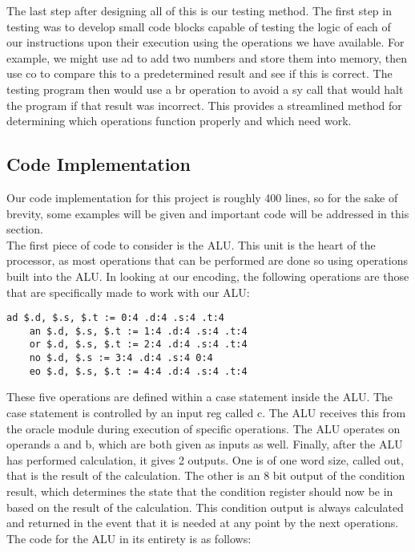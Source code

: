 \documentclass[journal]{IEEEtran}
\begin{document}
	The last step after designing all of this is our testing method. The first step in testing was to develop small code blocks capable of testing the logic of each of our instructions upon their execution using the operations we have available. For example, we might use ad to add two numbers and store them into memory, then use co to compare this to a predetermined result and see if this is correct. The testing program then would use a br operation to avoid a sy call that would halt the program if that result was incorrect. This provides a streamlined method for determining which operations function properly and which need work.

\subsection{Code Implementation}
	Our code implementation for this project is roughly 400 lines, so for the sake of brevity, some examples will be given and important code will be addressed in this section.\\
	
	The first piece of code to consider is the ALU. This unit is the heart of the processor, as most operations that can be performed are done so using operations built into the ALU. In looking at our encoding, the following operations are those that are specifically made to work with our ALU:
	
	\begin{Verbatim}[fontsize=\small]
	ad $.d, $.s, $.t := 0:4 .d:4 .s:4 .t:4
	an $.d, $.s, $.t := 1:4 .d:4 .s:4 .t:4
	or $.d, $.s, $.t := 2:4 .d:4 .s:4 .t:4
	no $.d, $.s := 3:4 .d:4 .s:4 0:4
	eo $.d, $.s, $.t := 4:4 .d:4 .s:4 .t:4
	\end{Verbatim}
	
	These five operations are defined within a case statement inside the ALU. The case statement is controlled by an input reg called c. The ALU receives this from the oracle module during execution of specific operations. The ALU operates on operands a and b, which are both given as inputs as well. Finally, after the ALU has performed calculation, it gives 2 outputs. One is of one word size, called out, that is the result of the calculation. The other is an 8 bit output of the condition result, which determines the state that the condition register should now be in based on the result of the calculation. This condition output is always calculated and returned in the event that it is needed at any point by the next operations. The code for the ALU in its entirety is as follows:
	
\end{document}
